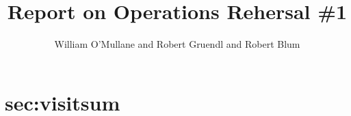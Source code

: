 \documentclass[DM,authoryear,toc]{lsstdoc}
\title{Report on Operations Rehersal \#1}
\author{%
William O'Mullane and Robert Gruendl and Robert Blum
}
\date{\vcsDate}
\begin{document}

\mkshorttitle




\appendix

\section{sec:visitsum}
\begin{code}

\end{code}

\label{sec:bib}


%
\label{sec:acronyms}
\printglossaries
\end{document}
